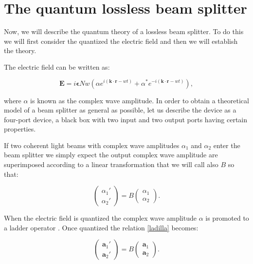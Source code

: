 \documentclass{book}
\begin{document}
{\section{The quantum lossless beam splitter}

Now, we will describe the quantum theory of a lossless beam splitter. To do this we will first consider the quantized the electric field and then we will establish the theory. 


The  electric field can be written as:

\begin{equation}
\mathbf{E}=i \mathbf{\epsilon}N w \left( \alpha e^{i (\mathbf{k \cdot r}-w t)}+\alpha^{*} e^{-i (\mathbf{k \cdot r}-w t)} \right),
\end{equation}

where $\alpha$ is known as the complex wave amplitude. In order to obtain a theoretical model of a beam splitter as general as possible, let us describe the device as a four-port device, a black box with two input and two output ports having certain properties.

If two coherent light beams with complex wave amplitudes $\alpha_{1}$ and $\alpha_{2}$ enter the beam splitter we simply expect the output complex wave amplitude  are superimposed according to a linear transformation that we will call also $B$ so that:

\begin{equation}
\begin{pmatrix} \alpha_{1}' \\ \alpha_{2}' \end{pmatrix}=B\begin{pmatrix} \alpha_{1} \\ \alpha_{2} \end{pmatrix}. \label{ladilla}
\end{equation}

When the electric field  is quantized the complex wave amplitude $\alpha$ is promoted to a ladder operator \cite{ludon}. Once quantized the relation \ref{ladilla} becomes:

\begin{equation}
\begin{pmatrix} \mathbf{a}_{1}' \\ \mathbf{a}_{2}' \end{pmatrix}=B\begin{pmatrix} \mathbf{a}_{1} \\ \mathbf{a}_{2} \end{pmatrix}.
\label{eq:amplitudes}
\end{equation}

}
\end{document}
